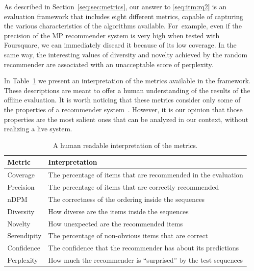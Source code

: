 As described in Section~\ref{seq:sec:metrics}, our answer to \ref{seq:itm:rq2} is an evaluation framework that includes eight different metrics, capable of capturing the various characteristics of the algorithms available. For~example, even if the precision of the MP recommender system is very high when tested with Foursquare, we can immediately discard it because of its low coverage. In the same way, the interesting values of diversity and novelty achieved by the random recommender are associated with an unacceptable score of perplexity.

In Table~\ref{seq:tab:metrics-interpretation} we present an interpretation of the metrics available in the framework. These descriptions are meant to offer a human understanding of the results of the offline evaluation. It is worth noticing that these metrics consider only some of the properties of a recommender system~\cite{Gunawardana2015}. However, it is our opinion that those properties are the most salient ones that can be analyzed in our context, without realizing a live system.

\begin{table}
\centering
\begin{tabular}{@{}ll@{}}
\toprule
Metric      & Interpretation                                                  \\ \midrule
Coverage    & The percentage of items that are recommended in the evaluation  \\
Precision   & The percentage of items that are correctly recommended          \\
nDPM        & The correctness of the ordering inside the sequences            \\
Diversity   & How diverse are the items inside the sequences                  \\
Novelty     & How unexpected are the recommended items                        \\
Serendipity & The percentage of non-obvious items that are correct            \\
Confidence  & The confidence that the recommender has about its predictions   \\
Perplexity  & How much the recommender is ``surprised'' by the test sequences \\ \bottomrule
\end{tabular}
\caption[Interpretation of the metrics]{A human readable interpretation of the metrics.}
\label{seq:tab:metrics-interpretation}
\end{table}

